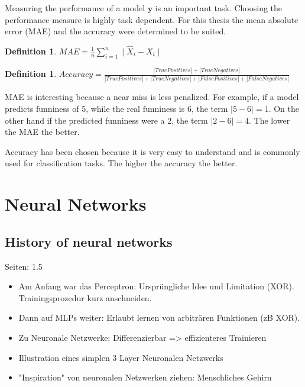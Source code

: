 \documentclass[draft,final,oneside]{vutinfth} %
\newcounter{DefCounter}
\begin{document}
Measuring the performance of a model $\boldsymbol{y}$ is an important task. Choosing the performance measure is highly task dependent. For this thesis the mean absolute error (MAE) and the accuracy were determined to be suited.

\newtheorem{mae}[DefCounter]{Definition}

\begin{mae}
$MAE = \frac{1}{n}\textstyle \sum_{i=1}^n \displaystyle\mid \hat{X}_i - X_i \mid$
\end{mae}

\newtheorem{accuracy}[DefCounter]{Definition}
\begin{accuracy}
$Accuracy = \frac{|True Positives| + |True Negatives|} {|True Positives| + |True Negatives| + |False Positives| + |False Negatives|}$
\end{accuracy}

MAE is interesting because a near miss is less penalized. For example, if a model predicts funniness of 5, while the real funniness is 6, the term $\mid 5 - 6 \mid = 1$. On the other hand if the predicted funniness were a 2, the term $\mid 2 - 6 \mid = 4$. The lower the MAE the better.

Accuracy has been chosen because it is very easy to understand and is commonly used for classification tasks. The higher the accuracy the better.




\fi

\section{Neural Networks}

\subsection{History of neural networks}
Seiten: 1.5

\begin{itemize}

\item Am Anfang war das Perceptron: Ursprüngliche Idee und Limitation (XOR). Trainingsprozedur kurz anschneiden.
\item Dann auf MLPs weiter: Erlaubt lernen von arbiträren Funktionen (zB XOR).
\item Zu Neuronale Netzwerke: Differenzierbar => effizienteres Trainieren
\item Illustration eines simplen 3 Layer Neuronalen Netzwerks
\item "Inspiration" von neuronalen Netzwerken ziehen: Menschliches Gehirn

\end{itemize}
\end{document}
